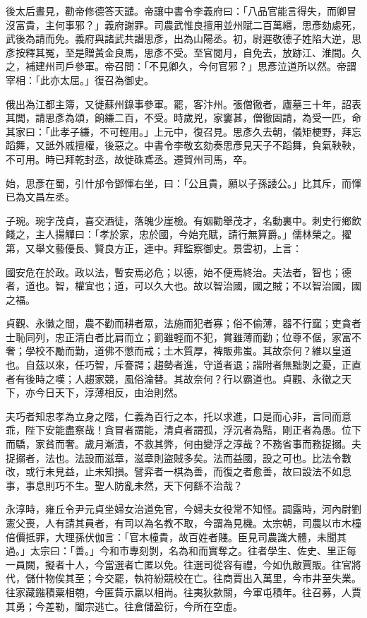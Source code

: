 \begin{pinyinscope}
 後太后晝見，勸帝修德答天譴。帝讓中書令李義府曰：「八品官能言得失，而卿冒沒富貴，主何事邪？」義府謝罪。司農武惟良擅用並州賦二百萬緡，思彥劾處死，武後為請而免。義府與諸武共譖思彥，出為山陽丞。初，尉遲敬德子姓陷大逆，思彥按釋其冤，至是贈黃金良馬，思彥不受。至官閱月，自免去，放跡江、淮間。久之，補建州司戶參軍。帝召問：「不見卿久，今何官邪？」思彥泣道所以然。帝謂宰相：「此亦太屈。」復召為御史。



 俄出為江都主簿，又徙蘇州錄事參軍。罷，客汴州。張僧徹者，廬墓三十年，詔表其閭，請思彥為頌，餉縑二百，不受。時歲兇，家窶甚，僧徹固請，為受一匹，命其家曰：「此孝子縑，不可輕用。」上元中，復召見。思彥久去朝，儀矩梗野，拜忘蹈舞，又詆外戚擅權，後惡之。中書令李敬玄劾奏思彥見天子不蹈舞，負氣鞅鞅，不可用。時已拜乾封丞，故徙硃鳶丞。遷賀州司馬，卒。



 始，思彥在蜀，引什邡令鄧惲右坐，曰：「公且貴，願以子孫諉公。」比其斥，而惲已為文昌左丞。



 子琬。琬字茂貞，喜交酒徒，落魄少崖檢。有姻勸舉茂才，名動裏中。刺史行鄉飲餞之，主人揚觶曰：「孝於家，忠於國，今始充賦，請行無算爵。」儒林榮之。擢第，又舉文藝優長、賢良方正，連中。拜監察御史。景雲初，上言：



 國安危在於政。政以法，暫安焉必危；以德，始不便焉終治。夫法者，智也；德者，道也。智，權宜也；道，可以久大也。故以智治國，國之賊；不以智治國，國之福。



 貞觀、永徽之間，農不勸而耕者眾，法施而犯者寡；俗不偷薄，器不行窳；吏貪者士恥同列，忠正清白者比肩而立；罰雖輕而不犯，賞雖薄而勸；位尊不倨，家富不奢；學校不勵而勤，道佛不懲而戒；土木質厚，裨販弗蚩。其故奈何？維以皇道也。自茲以來，任巧智，斥謇諤；趨勢者進，守道者退；諧附者無黜剝之憂，正直者有後時之嘆；人趨家競，風俗淪替。其故奈何？行以霸道也。貞觀、永徽之天下，亦今日天下，淳薄相反，由治則然。



 夫巧者知忠孝為立身之階，仁義為百行之本，托以求進，口是而心非，言同而意乖，陛下安能盡察哉！貪冒者謂能，清貞者謂孤，浮沉者為黠，剛正者為愚。位下而驕，家貧而奢。歲月漸漬，不救其弊，何由變浮之淳哉？不務省事而務捉搦。夫捉搦者，法也。法設而滋章，滋章則盜賊多矣。法而益國，設之可也。比法令數改，或行未見益，止未知損。譬弈者一棋為善，而復之者愈善，故曰設法不如息事，事息則巧不生。聖人防亂未然，天下何繇不治哉？



 永淳時，雍丘令尹元貞坐婦女治道免官，今婦夫女役常不知怪。調露時，河內尉劉憲父喪，人有請其員者，有司以為名教不取，今謂為見機。太宗朝，司農以市木橦倍價抵罪，大理孫伏伽言：「官木橦貴，故百姓者賤。臣見司農識大體，未聞其過。」太宗曰：「善。」今和市專刻剝，名為和而實奪之。往者學生、佐史、里正每一員闕，擬者十人，今當選者亡匿以免。往選司從容有禮，今如仇敵賈販。往官將代，儲什物俟其至；今交罷，執符紛競校在亡。往商賈出入萬里，今市井至失業。往家藏鏹積粟相匏，今匿貲示羸以相尚。往夷狄款關，今軍屯積年。往召募，人賈其勇；今差勒，闔宗逃亡。往倉儲盈衍，今所在空虛。




\end{pinyinscope}
